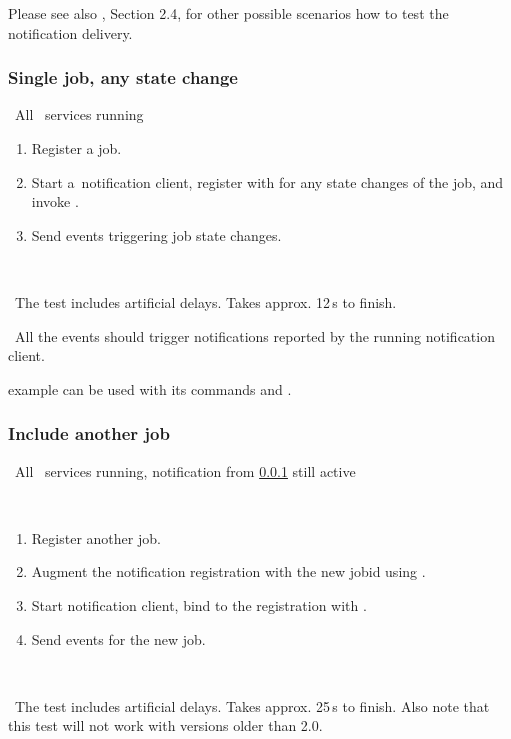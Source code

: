 Please see also \cite{lbug}, Section 2.4, for other possible scenarios how to test the notification delivery.


\subsubsection{Single job, any state change}
\label{notif1}
\req\ All \LB\ services running

\what
\begin{enumerate}
\item Register a job.
\item Start a~notification client,
register with  for any state changes of the job,
and invoke .
\item Send events triggering job state changes.
\end{enumerate}

\how\ 

\note\ The test includes artificial delays. Takes approx. 12\,s to finish.

\result\ All the events should trigger notifications reported by the running
notification client.

\begin{hints}
 example can be used with its commands  and .
\end{hints}


\subsubsection{Include another job}
\label{notif2}
\req\ All \LB\ services running, notification from \ref{notif1} still active

\how\
\begin{enumerate}
\item Register another job.
\item Augment the notification registration with the new jobid using
\code{edg\_wll\_NotifChange}.
\item Start notification client, bind to the registration with
.
\item Send events for the new job.
\end{enumerate}

\how\ 

\note\ The test includes artificial delays. Takes approx. 25\,s to finish. Also note that this test will not work with \LB versions older than 2.0.

